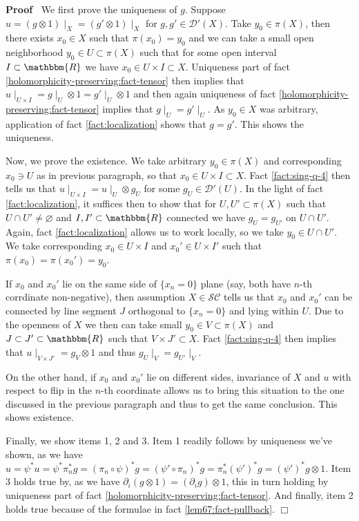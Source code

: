 \documentclass{article}
\renewenvironment{proof}{\noindent\textbf{Proof\ }}{\hspace*{\fill}$\Box$\medskip}
\theoremstyle{remark}
\begin{document}
\begin{proof}
  We first prove the uniqueness of $g$. Suppose $u = (g \otimes 1) \mid_X
  = (g' \otimes 1) \mid_X$ for $g, g' \in \mathcal{D}' (X)$. Take $y_0 \in
  \pi (X)$, then there exists $x_0 \in X$ such that $\pi (x_0) = y_0$ and we
  can take a small open neighborhood $y_0 \in U \subset \pi (X)$ such that for
  some open interval $I \subset \mathbbm{R}$ we have $x_0 \in U \times I
  \subset X$. Uniqueness part of fact
  \ref{holomorphicity-preserving:fact-tensor} then implies that $u \mid_{U
  \times I} = g \mid_U \otimes 1 = g' \mid_U \otimes 1$ and then again
  uniqueness of fact \ref{holomorphicity-preserving:fact-tensor} implies that
  $g \mid_U = g' \mid_U$. As $y_0 \in X$ was arbitrary, application of
  fact \ref{fact:localization} shows that $g = g'$. This shows the uniqueness.
  
  Now, we prove the existence. We take arbitrary $y_0 \in \pi (X)$ and
  corresponding $x_0 \ni U$ as in previous paragraph, so that $x_0 \in U
  \times I \subset X$. Fact \ref{fact:sing-q-4} then tells us that $u
  \mid_{U \times I} = u \mid_U \otimes g_U$ for some $g_U \in
  \mathcal{D}' (U)$. In the light of fact \ref{fact:localization}, it suffices
  then to show that for $U, U' \subset \pi (X)$ such that $U \cap U' \neq
  \varnothing$ and $I, I' \subset \mathbbm{R}$ connected we have $g_U =
  g_{U'}$ on $U \cap U'$. Again, fact \ref{fact:localization} allows us to
  work locally, so we take $y_0 \in U \cap U'$. We take corresponding $x_0 \in
  U \times I$ and $x_0' \in U \times I'$ such that $\pi (x_0) = \pi (x_0') =
  y_0$.
  
  If $x_0$ and $x_0'$ lie on the same side of $\{ x_n = 0 \}$ plane (say, both
  have $n$-th corrdinate non-negative), then assumption $X \in
  \mathcal{S}\mathcal{C}$ tells us that $x_0$ and $x_0'$ can be connected by
  line segment $J$ orthogonal to $\{ x_n = 0 \}$ and lying within $U$. Due to
  the openness of $X$ we then can take small $y_0 \in V \subset \pi (X)$ and
  $J \subset J' \subset \mathbbm{R}$ such that $V \times J' \subset X$. Fact
  \ref{fact:sing-q-4} then implies that $u \mid_{V \times J'} = g_V
  \otimes 1$ and thus $g_U \mid_V = g_{U'} \mid_V$.
  
  On the other hand, if $x_0$ and $x_0'$ lie on different sides, invariance
  of $X$ and $u$ with respect to flip in the $n$-th coordinate allows us to
  bring this situation to the one discussed in the previous paragraph and thus
  to get the same conclusion. This shows existence.
  
  Finally, we show items 1, 2 and 3. Item 1 readily follows by uniqueness
  we've shown, as we have $u = \psi^{\ast} u = \psi^{\ast} \pi_n^{\ast} g =
  (\pi_n \circ \psi)^{\ast} g = (\psi' \circ \pi_n)^{\ast} g = \pi_n^{\ast}
  (\psi')^{\ast} g = (\psi')^{\ast} g \otimes 1$. Item 3 holds true by, as we
  have $\partial_i (g \otimes 1) = (\partial_i g) \otimes 1$, this in turn
  holding by uniqueness part of fact
  \ref{holomorphicity-preserving:fact-tensor}. And finally, item 2 holds true
  because of the formulae in fact \ref{lem67:fact-pullback}.
\end{proof}
\end{document}
